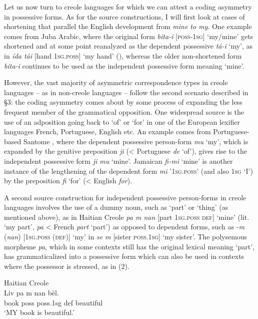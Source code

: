 \documentclass[output=paper]{langsci/langscibook}
\begin{document}
Let us now turn to creole languages for which we can attest a coding asymmetry in possessive forms. As for the source constructions, I will first look at cases of shortening that parallel the English development from \textit{mine to my}. One example comes from Juba Arabic, where the original form \textit{bita-i} [\textsc{poss-1sg}] `my/mine' gets shortened and at some point reanalyzed as the dependent possessive \textit{tá-i} `my', as in \textit{ída tái} [hand \textsc{1sg.poss}] `my hand' (\citealt{ManfrediPetrollino2013}), whereas the older non-shortened form \textit{bita-i} continues to be used as the independent possessive form meaning `mine'. 

However, the vast majority of asymmetric correspondence types in creole languages – as in non-creole languages – follow the second scenario described in §3: the coding asymmetry comes about by some process of expanding the less frequent member of the grammatical opposition. One widespread source is the use of an adposition going back to `of' or `for' in one of the European lexifier languages French, Portuguese, English etc. An example comes from Portuguese-based Santome \citep{Hagemeijer2013}, where the dependent possessive person-form \textit{mu} `my', which is expanded by the genitive preposition \textit{ji} (< Portuguese \textit{de} `of'), gives rise to the independent possessive form \textit{ji mu} `mine'. Jamaican \textit{fi-mi} `mine' is another instance of the lengthening of the dependent form \textit{mi} \textsc{'1sg.poss'} (and also 1\textsc{sg} `I') by the preposition \textit{fi} `for' (< English \textit{for}).

A second source construction for independent possessive person-forms in creole languages involves the use of a dummy noun, such as `part' or `thing' (as mentioned above), as in Haitian Creole \textit{pa m nan} [part \textsc{1sg.poss} \textsc{def}] `mine' (lit. `my part’, \textit{pa} < French \textit{part} `part') as opposed to dependent forms, such as -\textit{m} (\textit{nan}) [\textsc{1sg.poss} \textsc{(def)]} `my' in \textit{se m} [sister \textsc{poss.1sg]} `my sister'. The polysemous morpheme \textit{pa}, which in some contexts still has the original lexical meaning `part', has grammaticalized into a possessive form which can also be used in contexts where the possessor is stressed, as in (2).

\ea
{Haitian Creole \citep{Fattier2013}  }\\
\gll Liv  pa  m    nan  bèl.\\
     book  poss  poss.1sg  def  beautiful \\
\glt `MY book is beautiful.'
\z
\end{document}
